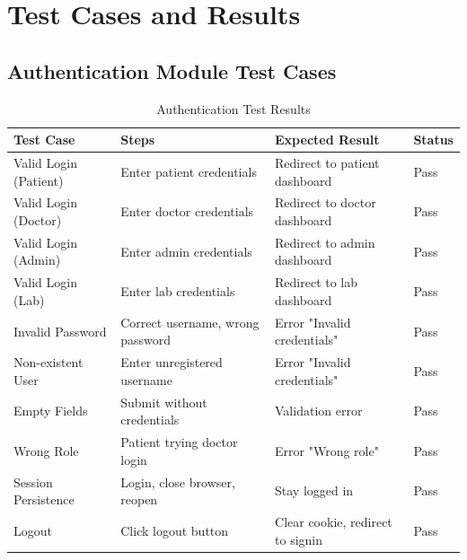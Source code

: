 \section{Test Cases and Results}

\subsection{Authentication Module Test Cases}

\begin{table}[H]
    \centering
    \small
    \vspace{-0.5\baselineskip}
    \setlength{\tabcolsep}{3pt}
    \begin{tabular}{|p{2.2cm}|p{3.5cm}|p{2.2cm}|p{1.2cm}|}
        \hline
        \textbf{Test Case} & \textbf{Steps} & \textbf{Expected Result} & \textbf{Status} \\
        \hline
        Valid Login (Patient) & Enter patient credentials & Redirect to patient dashboard & Pass \\
        \hline
        Valid Login (Doctor) & Enter doctor credentials & Redirect to doctor dashboard & Pass \\
        \hline
        Valid Login (Admin) & Enter admin credentials & Redirect to admin dashboard & Pass \\
        \hline
        Valid Login (Lab) & Enter lab credentials & Redirect to lab dashboard & Pass \\
        \hline
        Invalid Password & Correct username, wrong password & Error "Invalid credentials" & Pass \\
        \hline
        Non-existent User & Enter unregistered username & Error "Invalid credentials" & Pass \\
        \hline
        Empty Fields & Submit without credentials & Validation error & Pass \\
        \hline
        Wrong Role & Patient trying doctor login & Error "Wrong role" & Pass \\
        \hline
        Session Persistence & Login, close browser, reopen & Stay logged in & Pass \\
        \hline
        Logout & Click logout button & Clear cookie, redirect to signin & Pass \\
        \hline
    \end{tabular}
    \caption{Authentication Test Results}
    \label{tab:auth-tests}
\end{table}


